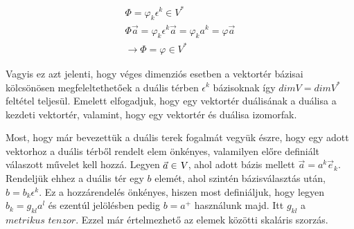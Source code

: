 \documentclass[a4paper,12pt]{article}
\begin{document}
\begin{align*}
\Phi = \varphi_{k}\epsilon^{k} \in V^{*} \\
\Phi\vec{a} = \varphi_{k}\epsilon^{k}\vec{a} = \varphi_{k}a^{k} = \varphi\vec{a} \\
\rightarrow \Phi = \varphi \in V^{*}
\end{align*}
\par Vagyis ez azt jelenti, hogy véges dimenziós esetben a vektortér bázisai kölcsönösen megfeleltethetőek a duális térben $\epsilon^{k}$ bázisoknak így $dimV = dimV^{*}$ feltétel teljesül. Emelett elfogadjuk, hogy egy vektortér duálisának a duálisa a kezdeti vektortér, valamint, hogy egy vektortér és duálisa izomorfak.
\newline
\par Most, hogy már bevezettük a duális terek fogalmát vegyük észre, hogy egy adott vektorhoz a duális térből rendelt elem önkényes, valamilyen előre definiált válaszott művelet kell hozzá. Legyen $\vec{a} \in \textsl{V}$, ahol adott bázis mellett $\vec{a} = a^{k}\vec{e}_{k}$. Rendeljük ehhez a duális tér egy $b$ elemét, ahol szintén bázisválasztás után, $b = b_{k}\epsilon^{k}$. Ez a hozzárendelés önkényes, hiszen most definiáljuk, hogy legyen $b_{k} = g_{kl}a^{l}$ és ezentúl jelölésben pedig $b = a^{+}$ használunk majd. Itt $g_{kl}$ a $\textit{metrikus tenzor}$. Ezzel már értelmezhető az elemek közötti skaláris szorzás.
\end{document}

